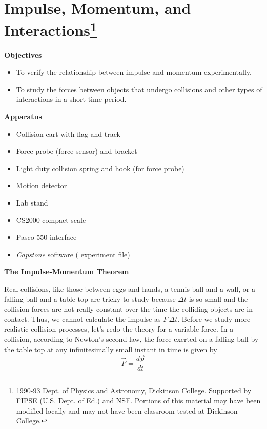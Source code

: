 \section{Impulse, Momentum, and Interactions\footnote{
1990-93 Dept. of Physics and Astronomy, Dickinson College. Supported by FIPSE
(U.S. Dept. of Ed.) and NSF. Portions of this material may have been modified
locally and may not have been classroom tested at Dickinson College.
}}

\makelabheader %

\medskip
\textbf{Objectives }

\begin{itemize}[nosep]
\item To verify the relationship between impulse and momentum experimentally. 
\item To study the forces between objects that undergo collisions and other types of interactions in a short time period.
\end{itemize}

\medskip
\textbf{Apparatus} 
\begin{itemize}[nosep]
\item Collision cart with flag and track 
\item Force probe (force sensor) and bracket
\item Light duty collision spring and hook (for force probe)
\item Motion detector
\item Lab stand
\item CS2000 compact scale
\item Pasco 550 interface
\item \textit{Capstone} software ( experiment file)
\end{itemize}
\textbf{The Impulse-Momentum Theorem }

Real collisions, like those between eggs and hands, a tennis ball and a wall, or
a falling ball and a table top are tricky to study because $\Delta t$ 
is so small and
the collision forces are not really constant over the time the colliding objects
are in contact. Thus, we cannot calculate the impulse as $F \,\Delta t$. 
Before we study
more realistic collision processes, let's redo the theory for a variable force.
In a collision, according to Newton's second law, the force exerted on a falling
ball by the table top at any infinitesimally small instant in time is given
by
\begin{equation}
{\vec  F}=\frac{d{\vec  p}}{dt}
\end{equation}

